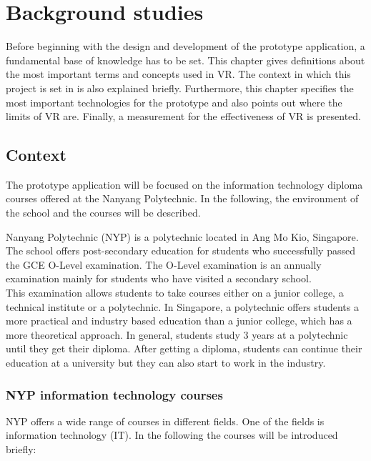 \chapter{Background studies} \label{stateofarts}
Before beginning with the design and development of the prototype application, a fundamental base of knowledge has to be set. This chapter gives definitions about the most important terms and concepts used in VR. The context in which this project is set in is also explained briefly. Furthermore, this chapter specifies the most important technologies for the prototype and also points out where the limits of VR are. Finally, a measurement for the effectiveness of  VR is presented.

\section{Context}
The prototype application will be focused on the information technology diploma courses offered at the Nanyang Polytechnic. In the following, the environment of the school and the courses will be described.

Nanyang Polytechnic (NYP) is a polytechnic located in Ang Mo Kio, Singapore. The school offers post-secondary education for students who successfully passed the GCE O-Level examination. The O-Level examination is an annually examination mainly for students who have visited a secondary school. \cite{aboutOLevel} \\ 
This examination allows students to take courses either on a junior college, a technical institute or a polytechnic. In Singapore, a polytechnic offers students a more practical and industry based education than a junior college, which has a more theoretical approach. In general, students study 3 years at a polytechnic until they get their diploma. After getting a diploma, students can continue their education at a university but they can also start to work in the industry. \cite{schoolSystem}
\subsection{NYP information technology courses}
NYP offers a wide range of courses in different fields. One of the fields is information technology (IT). In the following the courses will be introduced briefly: \cite{nypCourses}

